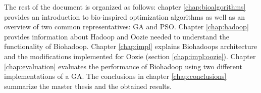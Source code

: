 % 
% 
% 

The rest of the document is organized as follows: chapter \ref{chap:bioalgorithms} provides an introduction to bio-inspired optimization algorithms as well as an overview of two common representatives: GA and PSO. Chapter \ref{chap:hadoop} provides information about Hadoop and Oozie needed to understand the functionality of Biohadoop. Chapter \ref{chap:impl} explains Biohadoops architecture and the modifications implemented for Oozie (section \ref{chap:impl:oozie}). Chapter \ref{chap:evaluation} evaluates the performance of Biohadoop using two different implementations of a GA. The conclusions in chapter \ref{chap:conclusions} summarize the master thesis and the obtained results.



